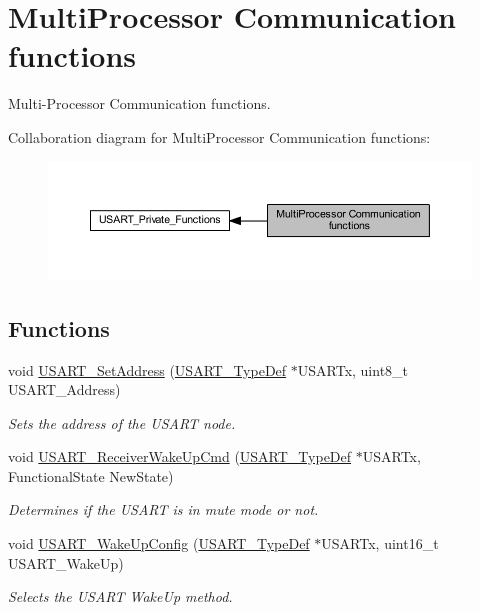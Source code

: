 \hypertarget{group___u_s_a_r_t___group3}{}\section{Multi\+Processor Communication functions}
\label{group___u_s_a_r_t___group3}


Multi-\/\+Processor Communication functions.  


Collaboration diagram for Multi\+Processor Communication functions\+:\nopagebreak
\begin{figure}[H]
\begin{center}
\leavevmode
\includegraphics[width=350pt]{group___u_s_a_r_t___group3}
\end{center}
\end{figure}
\subsection*{Functions}
\begin{DoxyCompactItemize}
\item 
void \hyperlink{group___u_s_a_r_t___group3_ga65ec9928817f3f031dd9a4dfc95d6666}{U\+S\+A\+R\+T\+\_\+\+Set\+Address} (\hyperlink{struct_u_s_a_r_t___type_def}{U\+S\+A\+R\+T\+\_\+\+Type\+Def} $\ast$U\+S\+A\+R\+Tx, uint8\+\_\+t U\+S\+A\+R\+T\+\_\+\+Address)
\begin{DoxyCompactList}\small\item\em Sets the address of the U\+S\+A\+RT node. \end{DoxyCompactList}\item 
void \hyperlink{group___u_s_a_r_t___group3_gac27b78ce445a16fe33851d2f87781c02}{U\+S\+A\+R\+T\+\_\+\+Receiver\+Wake\+Up\+Cmd} (\hyperlink{struct_u_s_a_r_t___type_def}{U\+S\+A\+R\+T\+\_\+\+Type\+Def} $\ast$U\+S\+A\+R\+Tx, Functional\+State New\+State)
\begin{DoxyCompactList}\small\item\em Determines if the U\+S\+A\+RT is in mute mode or not. \end{DoxyCompactList}\item 
void \hyperlink{group___u_s_a_r_t___group3_ga4965417c2412c36e462fcad50a8d5393}{U\+S\+A\+R\+T\+\_\+\+Wake\+Up\+Config} (\hyperlink{struct_u_s_a_r_t___type_def}{U\+S\+A\+R\+T\+\_\+\+Type\+Def} $\ast$U\+S\+A\+R\+Tx, uint16\+\_\+t U\+S\+A\+R\+T\+\_\+\+Wake\+Up)
\begin{DoxyCompactList}\small\item\em Selects the U\+S\+A\+RT Wake\+Up method. \end{DoxyCompactList}\end{DoxyCompactItemize}



